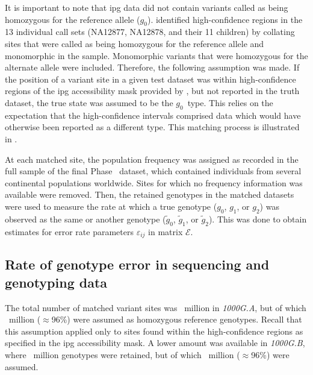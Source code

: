 It is important to note that \gls{ipg} data did not contain variants called as being homozygous for the reference allele ($g_0$).
 identified high-confidence regions in the 13 individual call sets (\textsf{NA12877}, \textsf{NA12878}, and their 11 children) by collating sites that were called as being homozygous for the reference allele and monomorphic in the sample.
Monomorphic variants that were homozygous for the alternate allele were included.
Therefore, the following assumption was made.
If the position of a variant site in a given test dataset was within high-confidence regions of the \gls{ipg} accessibility mask provided by \citet{Eberle:2016ki}, but not reported in the truth dataset, the true state was assumed to be the $g_0$~type.
This relies on the expectation that the high-confidence intervals comprised data which would have otherwise been reported as a different type.
This matching process is illustrated in .

At each matched site, the population frequency was assigned as recorded in the full sample of the final  Phase~ dataset, which contained  individuals from several continental populations worldwide.
Sites for which no frequency information was available were removed.
Then, the retained genotypes in the matched datasets were used to measure the rate at which a true genotype ($g_0$, $g_1$, or $g_2$) was observed as the same or another genotype ($\tilde{g}_0$, $\tilde{g}_1$, or $\tilde{g}_2$).
This was done to obtain estimates for error rate parameters $\varepsilon_{ij}$ in matrix $\mathcal{E}$.






%
\subsection{Rate of genotype error in sequencing and genotyping data}
%


The total number of matched variant sites was ~million in \emph{1000G.A}, but of which ~million ($\approx$96\%) were assumed as homozygous reference genotypes.
Recall that this assumption applied only to sites found within the high-confidence regions as specified in the \gls{ipg} accessibility mask.
A lower amount was available in \emph{1000G.B}, where ~million genotypes were retained, but of which ~million ($\approx$96\%) were assumed.

